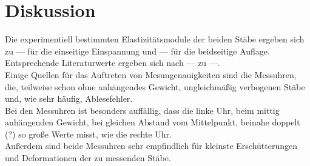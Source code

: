 \section{Diskussion}
\label{sec:Diskussion}

Die experimentiell bestimmten Elastizitätsmodule der beiden Stäbe ergeben sich zu --- für die 
einseitige Einspannung und --- für die beidseitige Auflage. \\
Entsprechende Literaturwerte ergeben sich nach --- zu ---.\\

Einige Quellen für das Auftreten von Mesungenauigkeiten sind die Messuhren, die, teilweise 
schon ohne anhängendes Gewicht, ungleichmäßig verbogenen Stäbe und, wie sehr häufig, Ablesefehler.\\
Bei den Messuhren ist besonders auffällig, dass die linke Uhr, beim mittig anhängenden Gewicht, 
bei gleichen Abstand vom Mittelpunkt, beinahe doppelt (?) so große Werte misst, wie die rechte Uhr.\\
Außerdem sind beide Messuhren sehr empfindlich für kleinste Erschütterungen und Deformationen der zu 
messenden Stäbe.\\